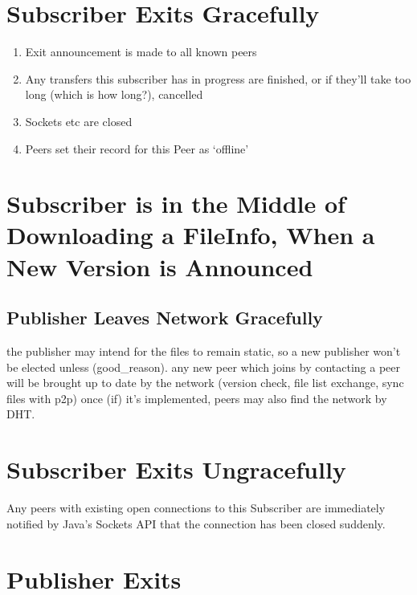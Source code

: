 \documentclass[12pt,a4paper,]{adreport}
\begin{document}
\section{Subscriber Exits Gracefully}\label{subscriber-exits-gracefully}

\begin{enumerate}
\def\labelenumi{\arabic{enumi}.}
\itemsep1pt\parskip0pt
\item
  Exit announcement is made to all known peers
\item
  Any transfers this subscriber has in progress are finished, or if
  they'll take too long (which is how long?), cancelled
\item
  Sockets etc are closed
\item
  Peers set their record for this Peer as `offline'
\end{enumerate}

\section{Subscriber is in the Middle of Downloading a FileInfo, When a
New Version is
Announced}\label{subscriber-is-in-the-middle-of-downloading-a-fileinfo-when-a-new-version-is-announced}

\subsection{Publisher Leaves Network
Gracefully}\label{publisher-leaves-network-gracefully}

the publisher may intend for the files to remain static, so a new
publisher won't be elected unless (good\_reason). any new peer which
joins by contacting a peer will be brought up to date by the network
(version check, file list exchange, sync files with p2p) once (if) it's
implemented, peers may also find the network by DHT.

\section{Subscriber Exits
Ungracefully}\label{subscriber-exits-ungracefully}

Any peers with existing open connections to this Subscriber are
immediately notified by Java's Sockets API that the connection has been
closed suddenly.

\section{Publisher Exits}\label{publisher-exits}
\end{document}
